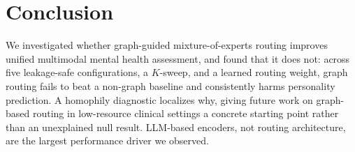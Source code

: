 \documentclass[letterpaper]{article}
\begin{document}
\section{Conclusion}

We investigated whether graph-guided mixture-of-experts routing improves unified multimodal mental health assessment, and found that it does not: across five leakage-safe configurations, a $K$-sweep, and a learned routing weight, graph routing fails to beat a non-graph baseline and consistently harms personality prediction. A homophily diagnostic localizes why, giving future work on graph-based routing in low-resource clinical settings a concrete starting point rather than an unexplained null result. LLM-based encoders, not routing architecture, are the largest performance driver we observed.



\end{document}

